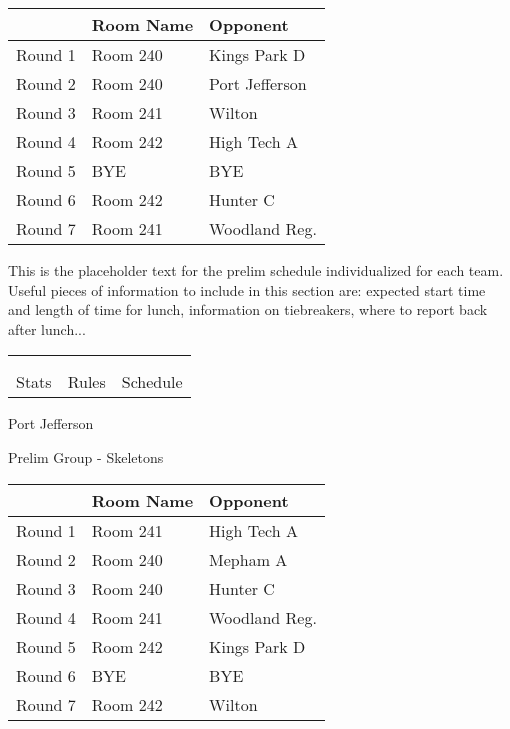 \documentclass{article}%
\begin{document}
\vspace*{4pt}%
\begin{tabularx}{\textwidth}{|c|Y|Y|}%
\hline%
&Room Name&Opponent\\%
\hline%
Round 1&Room 240&Kings Park D\\%
Round 2&Room 240&Port Jefferson\\%
Round 3&Room 241&Wilton\\%
Round 4&Room 242&High Tech A\\%
Round 5&BYE&BYE\\%
Round 6&Room 242&Hunter C\\%
Round 7&Room 241&Woodland Reg.\\%
\hline%
\end{tabularx}%
\vspace*{30pt}%
\linebreak%
This is the placeholder text for the prelim schedule individualized for each team. Useful pieces of information to include in this section are: expected start time and length of time for lunch, information on tiebreakers, where to report back after lunch...%
\vspace*{30pt}%
\newline%
%
\begin{tabularx}{\textwidth}{YYY}%
  &  &  \\%
\\%
Stats&Rules&Schedule\\%
\end{tabularx}%
\newpage%
%
\begin{center}%
\begin{Huge}%
Port Jefferson%
\end{Huge}%
\vspace*{12pt}%
\linebreak%
\begin{Large}%
Prelim Group {-} Skeletons%
\end{Large}%
\end{center}%
\vspace*{4pt}%
\begin{tabularx}{\textwidth}{|c|Y|Y|}%
\hline%
&Room Name&Opponent\\%
\hline%
Round 1&Room 241&High Tech A\\%
Round 2&Room 240&Mepham A\\%
Round 3&Room 240&Hunter C\\%
Round 4&Room 241&Woodland Reg.\\%
Round 5&Room 242&Kings Park D\\%
Round 6&BYE&BYE\\%
Round 7&Room 242&Wilton\\%
\hline%
\end{tabularx}%
\end{document}
